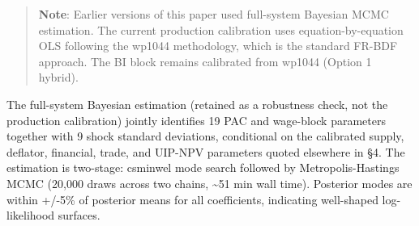 \documentclass[
]{article}
\begin{document}
\begin{quote}
\textbf{Note}: Earlier versions of this paper used full-system Bayesian
MCMC estimation. The current production calibration uses
equation-by-equation OLS following the wp1044 methodology, which is the
standard FR-BDF approach. The BI block remains calibrated from wp1044
(Option 1 hybrid).
\end{quote}

The full-system Bayesian estimation (retained as a robustness check, not
the production calibration) jointly identifies 19 PAC and wage-block
parameters together with 9 shock standard deviations, conditional on the
calibrated supply, deflator, financial, trade, and UIP-NPV parameters
quoted elsewhere in §4. The estimation is two-stage: csminwel mode
search followed by Metropolis-Hastings MCMC (20,000 draws across two
chains, \textasciitilde51 min wall time). Posterior modes are within
+/-5\% of posterior means for all coefficients, indicating well-shaped
log-likelihood surfaces.
\end{document}
